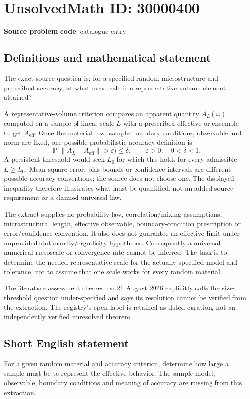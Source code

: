 \documentclass[11pt]{article}
\begin{document}
\section*{UnsolvedMath ID: 30000400}
\textbf{Source problem code:} catalogue entry
\subsection{Definitions and mathematical statement}
The exact source question is: for a specified random microstructure and prescribed accuracy, at what mesoscale is a representative volume element attained?

A representative-volume criterion compares an apparent quantity $A_L(\omega)$ computed on a sample of linear scale $L$ with a prescribed effective or ensemble target $A_{\mathrm{eff}}$. Once the material law, sample boundary conditions, observable and norm are fixed, one possible probabilistic accuracy definition is
\[
 \mathbb P\bigl(\|A_L-A_{\mathrm{eff}}\|>\varepsilon\bigr)\le\delta,
 \qquad\varepsilon>0,\quad0<\delta<1.
\]
A persistent threshold would seek $L_0$ for which this holds for every admissible $L\ge L_0$. Mean-square error, bias bounds or confidence intervals are different possible accuracy conventions; the source does not choose one. The displayed inequality therefore illustrates what must be quantified, not an added source requirement or a claimed universal law.

The extract supplies no probability law, correlation/mixing assumptions, microstructural length, effective observable, boundary-condition prescription or error/confidence convention. It also does not guarantee an effective limit under unprovided stationarity/ergodicity hypotheses. Consequently a universal numerical mesoscale or convergence rate cannot be inferred. The task is to determine the needed representative scale for the actually specified model and tolerance, not to assume that one scale works for every random material.

The literature assessment checked on 21 August 2026 explicitly calls the size-threshold question under-specified and says its resolution cannot be verified from the extraction. The registry's open label is retained as dated curation, not an independently verified unresolved theorem.
\subsection{Short English statement}
For a given random material and accuracy criterion, determine how large a sample must be to represent the effective behavior. The sample model, observable, boundary conditions and meaning of accuracy are missing from this extraction.
\end{document}

